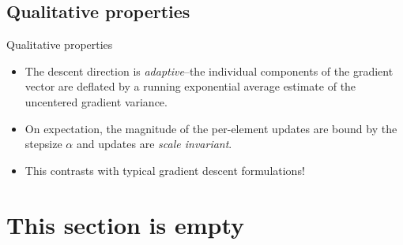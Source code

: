 \documentclass{beamer}
\begin{document}
\subsection{Qualitative properties}

\begin{frame}{Qualitative properties}
    \begin{itemize}
        \item
        The descent direction is \textit{adaptive}--the individual components
        of the gradient vector are deflated by a running exponential average
        estimate of the uncentered gradient variance.

        \item
        On expectation, the magnitude of the per-element updates are bound by
        the stepsize $ \alpha $ and updates are \textit{scale invariant}.

        \item
        This contrasts with typical gradient descent formulations!
    \end{itemize}
\end{frame}

\section{This section is empty}
\end{document}
